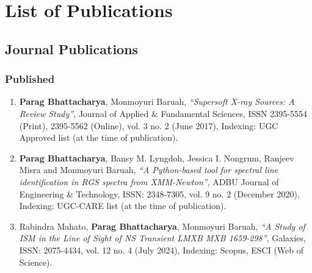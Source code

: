 \chapter{List of Publications} \label{appendix:publications}

    \section{Journal Publications}
    	\subsection{Published}
    		\begin{enumerate}
    			\item \textbf{Parag Bhattacharya}, Monmoyuri Baruah, \textit{``Supersoft X-ray Sources: A Review Study''}, Journal of Applied \& Fundamental Sciences, ISSN 2395-5554 (Print), 2395-5562 (Online), vol. 3 no. 2 (June 2017), Indexing: UGC Approved list (at the time of publication). \label{paper-jafs}
    			
    			\item \textbf{Parag Bhattacharya}, Bansy M. Lyngdoh, Jessica I. Nongrum, Ranjeev Misra and Monmoyuri Baruah, \textit{``A Python-based tool for spectral line identification in RGS spectra from XMM-Newton''}, ADBU Journal of Engineering \& Technology, ISSN: 2348-7305, vol. 9 no. 2 (December 2020), Indexing: UGC-CARE list (at the time of publication). \label{paper-ajet}
    			
    			\item Rabindra Mahato, \textbf{Parag Bhattacharya}, Monmoyuri Baruah, \textit{``A Study of ISM in the Line of Sight of NS Transient LMXB MXB 1659-298''}, Galaxies, ISSN: 2075-4434, vol. 12 no. 4 (July 2024), Indexing: Scopus, ESCI (Web of Science). \label{paper-galaxies}
    		\end{enumerate}
    	
    		
